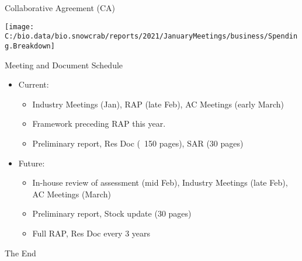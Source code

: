 \documentclass[
  ignorenonframetext,
]{beamer}
\begin{document}
\begin{frame}{Collaborative Agreement (CA)}
\protect\hypertarget{collaborative-agreement-ca}{}
\begin{center}\texttt{[image: C:/bio.data/bio.snowcrab/reports/2021/JanuaryMeetings/business/Spending.Breakdown]} \end{center}
\end{frame}

\begin{frame}{Meeting and Document Schedule}
\protect\hypertarget{meeting-and-document-schedule}{}
\begin{itemize}
\item
  Current:

  \begin{itemize}
  \item
    Industry Meetings (Jan), RAP (late Feb), AC Meetings (early March)
  \item
    Framework preceding RAP this year.
  \item
    Preliminary report, Res Doc (~150 pages), SAR (30 pages)
  \end{itemize}
\item
  Future:

  \begin{itemize}
  \item
    In-house review of assessment (mid Feb), Industry Meetings (late
    Feb), AC Meetings (March)
  \item
    Preliminary report, Stock update (30 pages)
  \item
    Full RAP, Res Doc every 3 years
  \end{itemize}
\end{itemize}
\end{frame}

\begin{frame}
The End
\end{frame}
\end{document}
